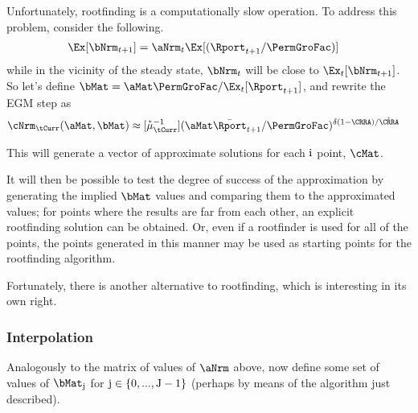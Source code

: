\documentclass[./SolvingMicroDSOPs]{subfiles}
\begin{document}
{  Unfortunately, rootfinding is a computationally slow operation.  To address this problem, consider the following.
  \begin{align}
    \Ex[\bNrm_{t+1}] & = \aNrm_{t}\Ex[(\Rport_{t+1}/\PermGroFac)]
  \end{align}
  while in the vicinity of the steady state, $\bNrm_{t}$ will be close to $\Ex_{t}[\bNrm_{t+1}]$.  So let's define $\bMat= \aMat \PermGroFac/\Ex_{t}[\Rport_{t+1}]$, and rewrite the EGM step as 
  \begin{align*}
    \mathfrak{\cNrm}_{\tCurr}(\aMat,\bMat) & \approx \muInvVect(\aMat \bar{\Rport}_{t+1}/\PermGroFac)^{\wealthU(1-\CRRA)/\grave{\CRRA}}
  \end{align*}

  This will generate a vector of approximate solutions for each $\mathrm{i}$ point, $\cMat$.  %

  It will then be possible to test the degree of success of the approximation by generating the implied $\bMat$ values and comparing them to the approximated values; for points where the results are far from each other, an explicit rootfinding solution can be obtained.  Or, even if a rootfinder is used for all of the points, the points generated in this manner may be used as starting points for the rootfinding algorithm.

  Fortunately, there is another alternative to rootfinding, which is interesting in its own right.  
  \subsubsection{Interpolation}

  Analogously to the matrix of values of $\aNrm$ above, now define some set of values of $\bMat_{\bIdx}$ for $\mathrm{j} \in \{0,...,\mathrm{J}-1\}$ (perhaps by means of the algorithm just described).

}
\end{document}
